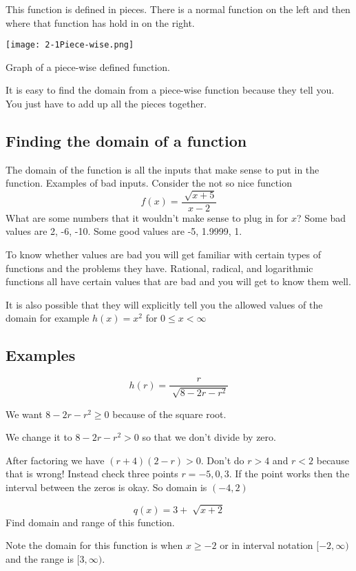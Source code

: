 \documentclass{tufte-handout}
\begin{document}
This function is defined in pieces.  There is a normal function on the left and then where that function has hold in on the right. \begin{marginfigure}
  \texttt{[image: 2-1Piece-wise.png]}
  \caption{Graph of a piece-wise defined function.}
  \label{fig:functionsets}
\end{marginfigure}
It is easy to find the domain from a piece-wise function because they tell you.  You just have to add up all the pieces together.
\subsection{Finding the domain of a function}
The domain of the function is all the inputs that make sense to put in the function.  Examples of bad inputs.
Consider the not so nice function
\[f(x) = \frac{\sqrt[]{x+5}}{x-2}\]
What are some numbers that it wouldn't make sense to plug in for $x$?
Some bad values are 2, -6, -10.  Some good values are -5, 1.9999, 1.

To know whether values are bad you will get familiar with certain types of functions and the problems they have. Rational, radical, and logarithmic functions all have certain values that are bad and you will get to know them well.

It is also possible that they will explicitly tell you the allowed values of the domain for example $h(x) = x^2$ for $ 0 \leq x < \infty$
\subsection{Examples}
\begin{equation}\label{ex:walk}
h(r) = \frac{r}{\sqrt[]{8-2r-r^2}}
\end{equation}

We want $8-2r-r^2 \geq 0$ because of the square root.

We change it to $8-2r-r^2 > 0 $ so that we don't divide by zero.

After factoring we have $(r+4)(2-r) > 0$.  Don't do $r>4$ and $r<2$ because that is wrong!  Instead check three points $r=-5,0,3$.  If the point works then the interval between the zeros is okay.  So domain is $(-4,2)$

\begin{equation} \label{ex:2}
q(x) = 3 + \sqrt[]{x+2}
\end{equation}
Find domain and range of this function.

Note the domain for this function is when $x\geq -2$ or in interval notation $[-2, \infty) $ and the range is $[3,\infty)$.
\end{document}
